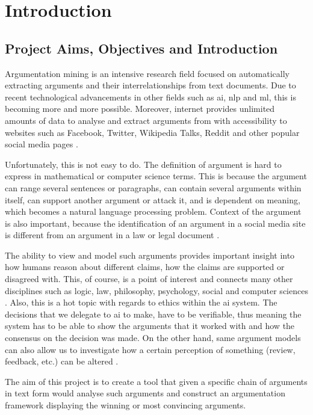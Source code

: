\section{Introduction}
\subsection{Project Aims, Objectives and Introduction} 
 Argumentation mining is an intensive research field focused on automatically extracting arguments and their interrelationships from text documents. Due to recent technological advancements in other fields such as \gls{ai}, \gls{nlp} and \gls{ml}, this is becoming more and more possible. Moreover, internet provides unlimited amounts of data to analyse and extract arguments from with accessibility to websites such as Facebook, Twitter, Wikipedia Talks, Reddit and other popular social media pages \citep{ArgMiningStateOfTheArt}. 
 
 Unfortunately, this is not easy to do. The definition of argument is hard to express in mathematical or computer science terms. This is because the argument can range several sentences or paragraphs, can contain several arguments within itself, can support another argument or attack it, and is dependent on meaning, which becomes a natural language processing problem. Context of the argument is also important, because the identification of an argument in a social media site is different from an argument in a law or legal document \citep{Cocarascu2017MiningBA}.

 The ability to view and model such arguments provides important insight into how humans reason about different claims, how the claims are supported or disagreed with. This, of course, is a point of interest and connects many other disciplines such as logic, law, philosophy, psychology, social and computer sciences \citep{ArgMiningStateOfTheArt}. Also, this is a hot topic with regards to ethics within the \gls{ai} system. The decisions that we delegate to \gls{ai} to make, have to be verifiable, thus meaning the system has to be able to show the arguments that it worked with and how the consensus on the decision was made. On the other hand, same argument models can also allow us to investigate how a certain perception of something (review, feedback, etc.) can be altered \citep{ApproxToTruth}.
 
 The aim of this project is to create a tool that given a specific chain of arguments in text form would analyse such arguments and construct an argumentation framework displaying the winning or most convincing arguments. 
 

